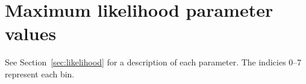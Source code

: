 \clearpage
\section{Maximum likelihood parameter values\label{app:ml-params}}
See Section~\ref{sec:likelihood} for a description of each parameter. 
The indicies 0--7 represent each \scalht bin.







